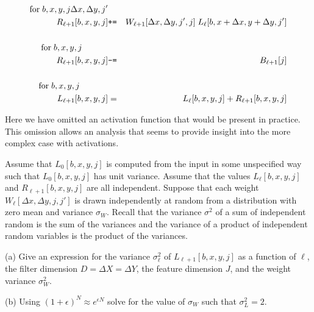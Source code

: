 \documentclass{article}
\newcommand{\solution}[1]{}
\begin{document}
\begin{eqnarray*}
  \mathrm{for}\;b,x,y,j\Delta x,\Delta y,j' \\
  \;\;\;  R_{\ell+1}[b,x,y,j] & \mbox{\tt +=} & W_{\ell+1}[\Delta x, \Delta y, j',j]\; L_{\ell}[b,x + \Delta x, y + \Delta y, j'] \\
  \\
  \mathrm{for}\;b,x,y,j \;\;\;\;\;\;\;\;\;\;\;\\
    \;\;\;  R_{\ell+1}[b,x,y,j] & \mbox{\tt -=} & B_{\ell+1}[j] \\
\\
\mathrm{for}\;b,x,y,j\;\;\;\;\;\;\;\;\;\;\;\;\\
L_{\ell+1}[b,x,y,j] & = & L_{\ell}[b,x,y,j] + R_{\ell+1}[b,x,y,j]
\end{eqnarray*}


Here we have omitted an activation function that would be present in practice.  This omission allows an analysis that seems to provide insight
into the more complex case with activations.

Assume that $L_0[b,x,y,j]$
is computed from the input in some unspecified way such that $L_0[b,x,y,j]$ has unit variance.
Assume that the values $L_\ell[b,x,y,j]$  and $R_{\ell+1}[b,x,y,j]$ are all independent.
Suppose that each weight $W_\ell[\Delta x,\Delta y,j,j']$ is drawn independently at random
from a distribution with zero mean and variance $\sigma_W$. Recall that the variance $\sigma^2$ of
a sum of independent random is the sum of the variances and the variance of a product of independent random variables is the product of the variances.

\medskip
(a) Give an expression for
the variance $\sigma^2_\ell$ of $L_{\ell+1}[b,x,y,j]$ as a function of $\ell$, the filter dimension $D = \Delta X = \Delta Y$,
the feature dimension $J$, and the weight variance $\sigma_W^2$.

\solution{
Assuming everything is independent we have

\begin{eqnarray*}
\sigma^2_{\ell+1} & = & \sigma^2_{\ell} + D^2J\sigma^2_w\sigma^2_{\ell} \\
\\
& = & \sigma^2_\ell(1 + D^2J\sigma^2_w)
\end{eqnarray*}

This gives
$$\sigma^2_\ell = (1 + D^2J\sigma^2_w)^\ell$$
} 

\medskip
(b) Using $(1+\epsilon)^N \approx e^{\epsilon N}$ solve for the value of $\sigma_W$ such that $\sigma^2_L = 2$.
\end{document}
